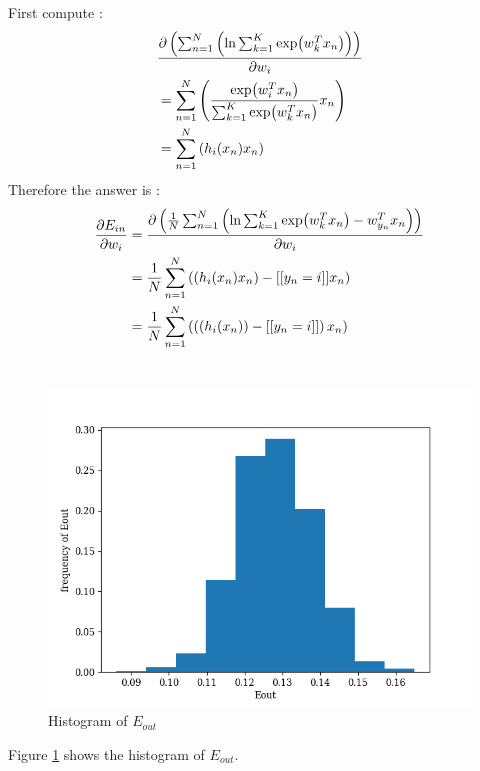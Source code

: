 \documentclass[12pt,a4paper]{article}
\theoremstyle{remark}
\begin{document}
\section{} %
First compute :
\[
	\begin{aligned}
		& \pdv{\left(\sum_{n=1}^{N} \left( \ln\sum_{k=1}^{K}
			\exp({w}_{k}^{T} x_{n})\right)\right)}{w_{i}} \\
		&= \sum_{n=1}^{N} \left( \frac{\exp({w}_{i}^{T} x_{n})}
			{\sum_{k=1}^{K} \exp({w}_{k}^{T} x_{n})}x_{n} \right) \\
		&= \sum_{n=1}^{N} \left( h_{i}(x_{n}) x_{n} \right) \\
	\end{aligned}
\]
Therefore the answer is :
\[
	\begin{aligned}
		\pdv{E_{in}}{w_{i}}
			&= \pdv{\left(\frac{1}{N} \sum_{n=1}^{N} \left( \ln \sum_{k=1}^{K} \exp({w}_{k}^{T}x_{n}) -
			{w}_{y_{n}}^{T}x_{n} \right) \right)}{w_{i}} \\
		&= \frac{1}{N} \sum_{n=1}^{N} \left( \left( h_{i}(x_{n}) x_{n} \right) -
			[[y_{n}=i]] x_{n} \right) \\
		&= \frac{1}{N} \sum_{n=1}^{N} \left( \left( \left( h_{i}(x_{n}) \right) -
			[[y_{n}=i]] \right) x_{n} \right) \\
	\end{aligned}
\]
\section{} %
\begin{figure}[h!]
	\centering
	\includegraphics[width=0.8\linewidth]{code/q7.png}
	\caption{Histogram of ${E}_{out}$}
	\label{fig:q7}
\end{figure}
Figure \ref{fig:q7} shows the histogram of ${E}_{out}$.
\end{document}
